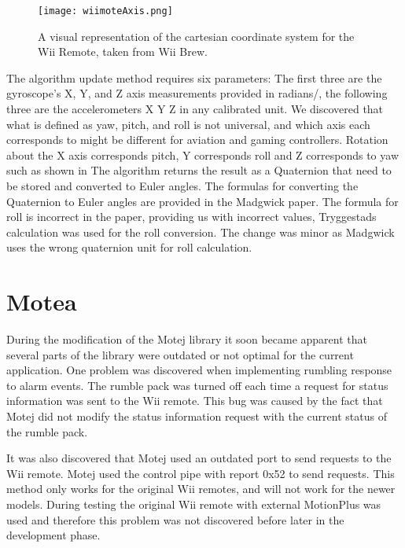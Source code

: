 \begin{figure}[h!]
  \centering
    \texttt{[image: wiimoteAxis.png]}
    \caption{\footnotesize A visual representation of the cartesian coordinate system for the Wii Remote, taken from Wii Brew\cite{wiiBrew}.}
\end{figure}


The algorithm update method requires six parameters: The first three are the gyroscope's X, Y, and Z axis measurements provided in radians/, the following three are the accelerometers X Y Z in any calibrated unit. We discovered that what is defined as yaw, pitch, and roll is not universal, and which axis each corresponds to might be different for aviation and gaming controllers. Rotation about the X axis corresponds pitch, Y corresponds roll and Z corresponds to yaw such as shown in %
The algorithm returns the result as a Quaternion that need to be stored and converted to Euler angles. The formulas for converting the Quaternion to Euler angles are provided in the Madgwick paper. The formula for roll is incorrect in the paper, providing us with incorrect values, Tryggestads calculation was used for the roll conversion. The change was minor as Madgwick uses the wrong quaternion unit for roll calculation.


\section{Motea}
During the modification of the Motej library it soon became apparent that several parts of the library were outdated or not optimal for the current application. One problem was discovered when implementing rumbling response to alarm events. The rumble pack was turned off each time a request for status information was sent to the Wii remote. This bug was caused by the fact that Motej did not modify the status information request with the current status of the rumble pack.

It was also discovered that Motej used an outdated port to send requests to the Wii remote. Motej used the control pipe with report 0x52 to send requests. This method only works for the original Wii remotes, and will not work for the newer models. During testing the original Wii remote with external MotionPlus was used and therefore this problem was not discovered before later in the development phase.

